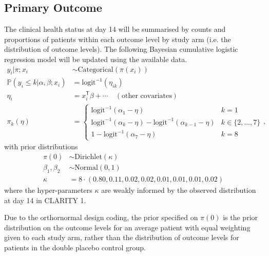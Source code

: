 \documentclass[11pt,parskip=half-]{scrartcl}
\begin{document}
\subsection{Primary Outcome}\label{sec:primary-outcome-analysis}
The clinical health status at day 14 will be summarised by counts and proportions of patients within each outcome level by study arm (i.e. the distribution of outcome levels). The following Bayesian cumulative logistic regression model will be updated using the available data.
$$
    \begin{aligned}
        y_{i} | \pi;x_i                            & \sim \text{Categorical}(\pi(x_i))                              \\
        \mathbb P(y_i \leq k | \alpha, \beta; x_i) & = \text{logit}^{-1}(\eta_{ik})                                 \\
        \eta_{i}                                   & = x_i^{\mathsf{T}}\beta + \cdots\quad(\text{other covariates}) \\
        \pi_k(\eta)                                & = \begin{cases}
            \text{logit}^{-1}(\alpha_1 - \eta)                                            & k=1             \\
            \text{logit}^{-1}(\alpha_{k} - \eta) - \text{logit}^{-1}(\alpha_{k-1} - \eta) & k\in\{2,...,7\} \\
            1 - \text{logit}^{-1}(\alpha_{7} - \eta)                                      & k=8
        \end{cases},
    \end{aligned}
$$
with prior distributions
$$
    \begin{aligned}
        \pi(0)          & \sim \text{Dirichlet}(\kappa)                            \\
        \beta_1,\beta_2 & \sim \text{Normal}(0, 1)                                 \\
        \kappa          & = 8\cdot(0.80, 0.11, 0.02, 0.02, 0.01, 0.01, 0.01, 0.02)
    \end{aligned}
$$
where the hyper-parameters $\kappa$ are weakly informed by the observed distribution at day 14 in CLARITY 1.

Due to the orthornormal design coding, the prior specified on $\pi(0)$ is the prior distribution on the outcome levels for an average patient with equal weighting given to each study arm, rather than the distribution of outcome levels for patients in the double placebo control group.
\end{document}
